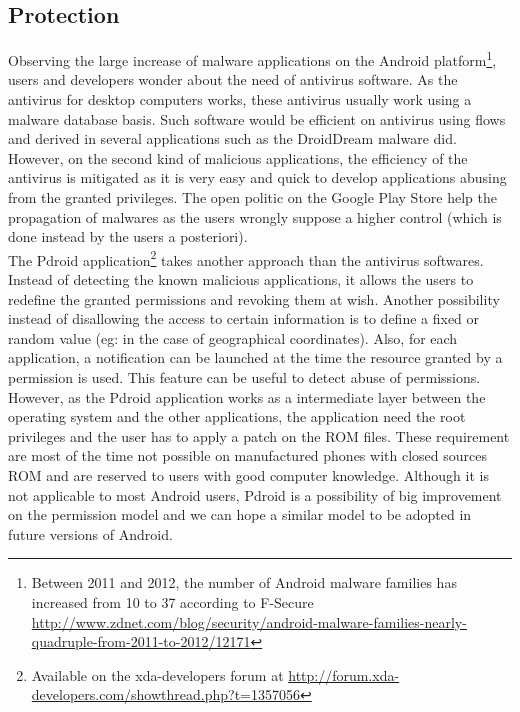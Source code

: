 \subsection{Protection}
Observing the large increase of malware applications on the Android platform\footnote{Between 2011 and 2012, the number of Android malware families has increased from 10 to 37 according to F-Secure \url{http://www.zdnet.com/blog/security/android-malware-families-nearly-quadruple-from-2011-to-2012/12171}}, users and developers wonder about the need of antivirus software.
As the antivirus for desktop computers works, these antivirus usually work using a malware database basis.
Such software would be efficient on antivirus using flows and derived in several applications such as the DroidDream malware did.
However, on the second kind of malicious applications, the efficiency of the antivirus is mitigated as it is very easy and quick to develop applications abusing from the granted privileges.
The open politic on the Google Play Store help the propagation of malwares as the users wrongly suppose a higher control (which is done instead by the users a posteriori).\\

The Pdroid application\footnote{Available on the xda-developers forum at \url{http://forum.xda-developers.com/showthread.php?t=1357056}} takes another approach than the antivirus softwares.
Instead of detecting the known malicious applications, it allows the users to redefine the granted permissions and revoking them at wish.
Another possibility instead of disallowing the access to certain information is to define a fixed or random value (eg: in the case of geographical coordinates).
Also, for each application, a notification can be launched at the time the resource granted by a permission is used.
This feature can be useful to detect abuse of permissions.
However, as the Pdroid application works as a intermediate layer between the operating system and the other applications, the application need the root privileges and the user has to apply a patch on the ROM files.
These requirement are most of the time not possible on manufactured phones with closed sources ROM and are reserved to users with good computer knowledge.
Although it is not applicable to most Android users, Pdroid is a possibility of big improvement on the permission model and we can hope a similar model to be adopted in future versions of Android.